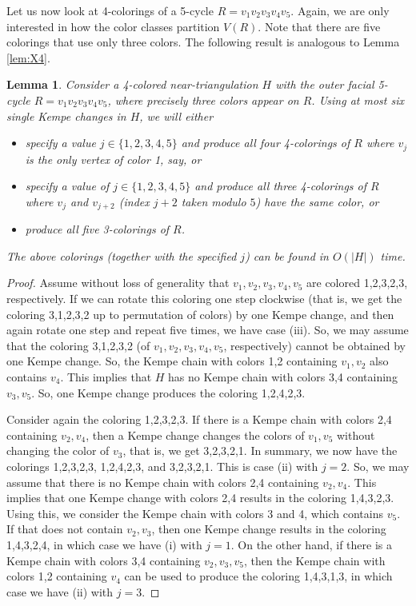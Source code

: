 \documentclass[10pt,a4paper]{article}
\newtheorem{lem}[thm]{Lemma}
\begin{document}
Let us now look at 4-colorings of a 5-cycle $R=v_1 v_2 v_3 v_4v_5$. Again, we are only interested in how the color classes partition $V(R)$. Note that there are five colorings that use only three colors. The following result is analogous to Lemma \ref{lem:X4}. 

\begin{lem}\label{lem:X5} 
Consider a 4-colored near-triangulation $H$ with the outer facial 5-cycle $R=v_1 v_2 v_3 v_4v_5$, where precisely three colors appear on $R$. 
Using at most six single Kempe changes in $H$, we will either
\begin{itemize}
\item[(i)] specify a value $j \in \{1,2,3,4,5\}$ and produce all four 4-colorings of $R$ where $v_j$ is the only vertex of color 1, say, or
\item[(ii)] specify a value of $j \in \{1,2,3,4,5\}$ and
produce all three 4-colorings of $R$ where $v_j$ and $v_{j+2}$ (index $j+2$ taken modulo $5$) have the same color, or
\item[(iii)] produce all five 3-colorings of $R$.
\end{itemize}
The above colorings (together with the specified $j$) can be found in $O(|H|)$ time.
\end{lem}

\begin{proof}
Assume without loss of generality that $v_1,v_2,v_3,v_4,v_5$ are colored 1,2,3,2,3, respectively. If we can
rotate this coloring one step clockwise (that is, we get the coloring 3,1,2,3,2 up to permutation of colors) by one Kempe change, and then again rotate one step and repeat five times, we have case (iii). So, we may assume that the coloring 3,1,2,3,2 (of $v_1,v_2,v_3,v_4,v_5$, respectively) cannot be obtained by one Kempe change. 
So, the Kempe chain with colors 1,2 containing $v_1,v_2$ also contains $v_4$.
This implies that $H$ has no Kempe chain with colors 3,4 containing $v_3,v_5$. So, one Kempe change produces the coloring 1,2,4,2,3. 

Consider again the coloring 1,2,3,2,3. If there is a Kempe chain with colors 2,4 containing $v_2,v_4$, then a Kempe change changes the colors of $v_1,v_5$ without changing the color of $v_3$, that is, we get 3,2,3,2,1. In summary, we now have the colorings 1,2,3,2,3, 1,2,4,2,3, and 3,2,3,2,1. This is case (ii) with $j=2$. So, we may assume that there is no Kempe chain with colors 2,4 containing $v_2,v_4$. This implies that one Kempe change with colors 2,4 results in the coloring 1,4,3,2,3. Using this, we consider the Kempe chain with colors 3 and 4, which contains $v_5$.
If that does not contain $v_2,v_3$, then one Kempe change results in the coloring 1,4,3,2,4, in which case we have (i) with $j=1$. On the other hand, if there is a Kempe chain with colors 3,4 containing $v_2,v_3,v_5$, then the Kempe chain with colors 1,2 containing $v_4$ can be used to produce the coloring 1,4,3,1,3, in which case we have (ii) with $j=3$.
\end{proof} 
\end{document}
